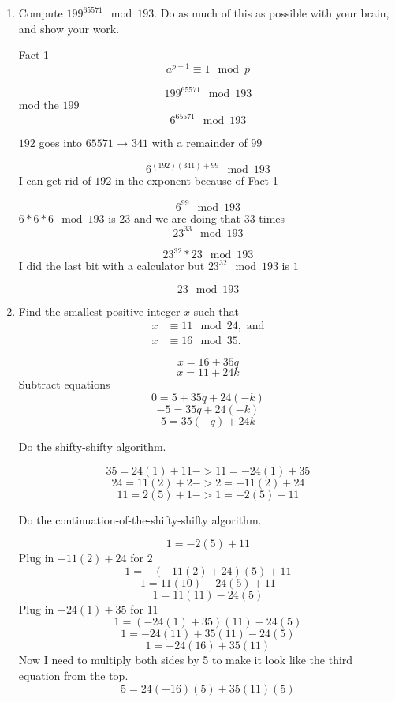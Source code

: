 \documentclass[10pt, AMS Euler]{article}
\begin{document}
\begin{enumerate}
		\newpage
		\item Compute $199^{65571}\!\! \mod 193$.  Do as much of this as possible with your brain, and show your work.

        Fact 1
        $$ a^{p-1} \equiv 1 \mod p $$

        $$ 199^{65571} \mod 193 $$
        mod the $199$
        $$ 6^{65571} \mod 193 $$

        $192$ goes into $65571$ → $341$ with a remainder of $99$

        $$ 6^{(192)(341)+99} \mod 193 $$
        I can get rid of $192$ in the exponent because of Fact 1

        $$ 6^{99} \mod 193 $$
        $6*6*6 \mod 193$ is $23$ and we are doing that $33$ times
        $$ 23^{33} \mod 193 $$

        $$ 23^{32} * 23 \mod 193 $$
        I did the last bit with a calculator but $23^{32} \mod 193$ is $1$

        $$ 23 \mod 193 $$



        \newpage
		\item Find the smallest positive integer $x$ such that 
		\begin{align*}
			x &\equiv 11 \!\!\! \mod 24,  \mbox{ and}\\ 
			x &\equiv 16 \!\!\! \mod 35.
		\end{align*}

            $$ x = 16 + 35 q $$
            $$ x = 11 + 24 k $$
            Subtract equations
            $$ 0 = 5 + 35q +24(-k) $$
            $$ -5 = 35q +24(-k) $$
            $$ 5 = 35(-q) +24k $$

            Do the shifty-shifty algorithm.

            $$ 35 = 24(1) + 11 -> 11 = -24(1)+35 $$
            $$ 24 = 11(2) + 2 -> 2 = -11(2) + 24 $$
            $$ 11 = 2(5) + 1 -> 1 = -2(5) + 11 $$

            Do the continuation-of-the-shifty-shifty algorithm.

            $$ 1 = -2(5) + 11 $$
            Plug in $-11(2) + 24$ for $2$
            $$ 1 = -(-11(2) + 24)(5) + 11 $$
            $$ 1 = 11(10) - 24(5) + 11 $$
            $$ 1 = 11(11) - 24(5) $$
            Plug in $-24(1)+35$ for $11$
            $$ 1 = (-24(1)+35)(11) - 24(5) $$
            $$ 1 = -24(11)+35(11) - 24(5) $$
            $$ 1 = -24(16) + 35(11) $$
            Now I need to multiply both sides by 5 to make it look like the third equation from the top.
            $$ 5 = 24(-16)(5) + 35(11)(5) $$
            

\end{enumerate}
\end{document}
